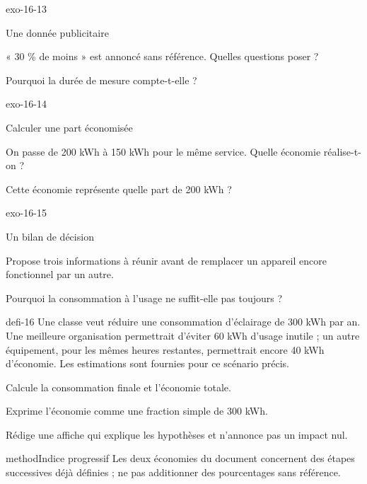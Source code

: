 \documentclass[12pt,twoside,openany]{book}
\begin{document}
\begin{blocLivre}{exo-16-13}
\begin{exercice}[3]{Une donnée publicitaire}
\begin{questions}
\item « 30 \% de moins » est annoncé sans référence. Quelles questions poser ?
\item Pourquoi la durée de mesure compte-t-elle ?
\end{questions}
\end{exercice}\end{blocLivre}
\begin{blocLivre}{exo-16-14}
\begin{exercice}[3]{Calculer une part économisée}
\begin{questions}
\item On passe de 200 kWh à 150 kWh pour le même service. Quelle économie réalise-t-on ?
\item Cette économie représente quelle part de 200 kWh ?
\end{questions}
\end{exercice}\end{blocLivre}
\begin{blocLivre}{exo-16-15}
\begin{exercice}[3]{Un bilan de décision}
\begin{questions}
\item Propose trois informations à réunir avant de remplacer un appareil encore fonctionnel par un autre.
\item Pourquoi la consommation à l’usage ne suffit-elle pas toujours ?
\end{questions}
\end{exercice}\end{blocLivre}
\label{defi-ex-16}
\begin{pcFiche}{defi-16}
Une classe veut réduire une consommation d’éclairage de 300 kWh par an. Une meilleure organisation permettrait d’éviter 60 kWh d’usage inutile ; un autre équipement, pour les mêmes heures restantes, permettrait encore 40 kWh d’économie. Les estimations sont fournies pour ce scénario précis.\par
{}
\begin{questions}
\item Calcule la consommation finale et l’économie totale.
\item Exprime l’économie comme une fraction simple de 300 kWh.
\item Rédige une affiche qui explique les hypothèses et n’annonce pas un impact nul.
\end{questions}
\begin{pcEncadre}{method}{Indice progressif}
Les deux économies du document concernent des étapes successives déjà définies ; ne pas additionner des pourcentages sans référence.\par
\end{pcEncadre}
\end{pcFiche}
\end{document}
